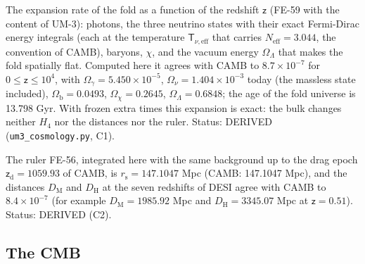 \documentclass[
  10pt,
]{article}
\begin{document}
The expansion rate of the fold as a function of the redshift
\(\mathsf{z}\) (FE-59 with the content of UM-3): photons, the three
neutrino states with their exact Fermi-Dirac energy integrals (each at
the temperature \(\mathsf{T}_{\nu,\mathrm{eff}}\) that carries
\(N_{\mathrm{eff}} = 3.044\), the convention of CAMB), baryons,
\(\chi\), and the vacuum energy \(\Omega_\Lambda\) that makes the fold
spatially flat. Computed here it agrees with CAMB to
\(8.7\times10^{-7}\) for \(0 \le \mathsf{z} \le 10^4\), with
\(\Omega_\gamma = 5.450\times10^{-5}\),
\(\Omega_\nu = 1.404\times10^{-3}\) today (the massless state included),
\(\Omega_{\mathrm{b}} = 0.0493\), \(\Omega_\chi = 0.2645\),
\(\Omega_\Lambda = 0.6848\); the age of the fold universe is 13.798 Gyr.
With frozen extra times this expansion is exact: the bulk changes
neither \(H_4\) nor the distances nor the ruler. Status: DERIVED
(\texttt{um3\_cosmology.py}, C1).

The ruler FE-56, integrated here with the same background up to the drag
epoch \(\mathsf{z}_{\mathrm{d}} = 1059.93\) of CAMB, is
\(r_{\mathrm{s}} = 147.1047\) Mpc (CAMB: 147.1047 Mpc), and the
distances \(D_{\mathrm{M}}\) and \(D_{\mathrm{H}}\) at the seven
redshifts of DESI agree with CAMB to \(8.4\times10^{-7}\) (for example
\(D_{\mathrm{M}} = 1985.92\) Mpc and \(D_{\mathrm{H}} = 3345.07\) Mpc at
\(\mathsf{z} = 0.51\)). Status: DERIVED (C2).

\hypertarget{the-cmb}{%
\subsection{The CMB}\label{the-cmb}}
\end{document}
